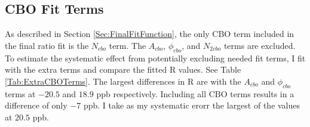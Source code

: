 



	\subsection{CBO Fit Terms}
	\label{SubSec:CBOFitTerms}

		As described in Section \ref{Sec:FinalFitFunction}, the only CBO term included in the final ratio fit is the $N_{cbo}$ term. The $A_{cbo}$, $\phi_{cbo}$, and $N_{2cbo}$ terms are excluded. To estimate the systematic effect from potentially excluding needed fit terms, I fit with the extra terms and compare the fitted R values. See Table \ref{Tab:ExtraCBOTerms}. The largest differences in R are with the $A_{cbo}$ and $\phi_{cbo}$ terms at $-20.5$ and $18.9$ ppb respectively. Including all CBO terms results in a difference of only $-7$ ppb. I take as my systematic erorr the largest of the values at $20.5$ ppb.

